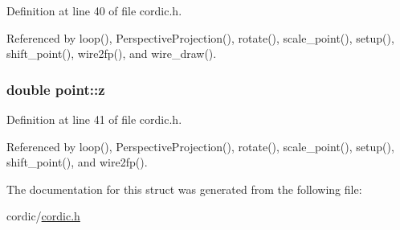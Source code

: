 Definition at line 40 of file cordic.\+h.



Referenced by loop(), Perspective\+Projection(), rotate(), scale\+\_\+point(), setup(), shift\+\_\+point(), wire2fp(), and wire\+\_\+draw().

\subsubsection[{\texorpdfstring{z}{z}}]{\setlength{\rightskip}{0pt plus 5cm}double point\+::z}\hypertarget{structpoint_aab1f0c3682401083b5bf252e7001874f}{}\label{structpoint_aab1f0c3682401083b5bf252e7001874f}


Definition at line 41 of file cordic.\+h.



Referenced by loop(), Perspective\+Projection(), rotate(), scale\+\_\+point(), setup(), shift\+\_\+point(), and wire2fp().



The documentation for this struct was generated from the following file\+:\begin{DoxyCompactItemize}
\item 
cordic/\hyperlink{cordic_8h}{cordic.\+h}\end{DoxyCompactItemize}
